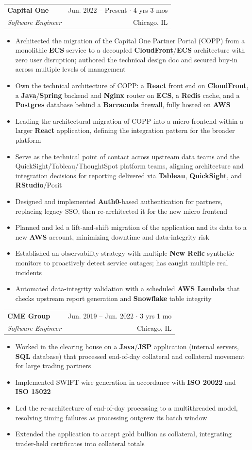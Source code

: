 \documentclass[letterpaper,11pt]{article}
\makeatletter
\newcommand{\resumeItem}[1]{
    \item\small{
            {#1 \vspace{-1pt}}
    }
}
\newcommand{\resumeSubheading}[4]{
    \vspace{-1pt}\item
    \begin{tabular*}{\textwidth}[t]{l@{\extracolsep{\fill}}r}
        \textbf{#1} & {\color{dark-grey}\small #2}\vspace{1pt}\\ %
        \textit{#3} & {\color{dark-grey} \small #4}\\ %
    \end{tabular*}\vspace{-4pt}
}
\newcommand{\resumeItemListStart}{\begin{itemize}}
\newcommand{\resumeItemListEnd}{\end{itemize}\vspace{0pt}}
\makeatother
\begin{document}
\resumeSubheading
{Capital One}{Jun. 2022 -- Present $\cdot$ 4 yrs 3 mos}
{Software Engineer}{Chicago, IL}
\resumeItemListStart
\resumeItem{Architected the migration of the Capital One Partner Portal (COPP) from a monolithic \textbf{ECS} service to a decoupled \textbf{CloudFront}/\textbf{ECS} architecture with zero user disruption; authored the technical design doc and secured buy-in across multiple levels of management}
\resumeItem{Own the technical architecture of COPP: a \textbf{React} front end on \textbf{CloudFront}, a \textbf{Java}/\textbf{Spring} backend and \textbf{Nginx} router on \textbf{ECS}, a \textbf{Redis} cache, and a \textbf{Postgres} database behind a \textbf{Barracuda} firewall, fully hosted on \textbf{AWS}}
\resumeItem{Leading the architectural migration of COPP into a micro frontend within a larger \textbf{React} application, defining the integration pattern for the broader platform}
\resumeItem{Serve as the technical point of contact across upstream data teams and the QuickSight/Tableau/ThoughtSpot platform teams, aligning architecture and integration decisions for reporting delivered via \textbf{Tableau}, \textbf{QuickSight}, and \textbf{RStudio}/Posit}
\resumeItem{Designed and implemented \textbf{Auth0}-based authentication for partners, replacing legacy SSO, then re-architected it for the new micro frontend}
\resumeItem{Planned and led a lift-and-shift migration of the application and its data to a new \textbf{AWS} account, minimizing downtime and data-integrity risk}
\resumeItem{Established an observability strategy with multiple \textbf{New Relic} synthetic monitors to proactively detect service outages; has caught multiple real incidents}
\resumeItem{Automated data-integrity validation with a scheduled \textbf{AWS Lambda} that checks upstream report generation and \textbf{Snowflake} table integrity}
\resumeItemListEnd

\resumeSubheading
{CME Group}{Jun. 2019 -- Jun. 2022 $\cdot$ 3 yrs 1 mo}
{Software Engineer}{Chicago, IL}
\resumeItemListStart
\resumeItem{Worked in the clearing house on a \textbf{Java}/\textbf{JSP} application (internal servers, \textbf{SQL} database) that processed end-of-day collateral and collateral movement for large trading partners}
\resumeItem{Implemented SWIFT wire generation in accordance with \textbf{ISO 20022} and \textbf{ISO 15022}}
\resumeItem{Led the re-architecture of end-of-day processing to a multithreaded model, resolving timing failures as processing outgrew its batch window}
\resumeItem{Extended the application to accept gold bullion as collateral, integrating trader-held certificates into collateral totals}
\resumeItemListEnd
\end{document}
